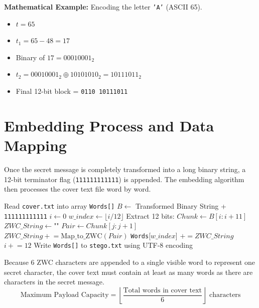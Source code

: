 \documentclass[12pt,a4paper]{report}
\begin{document}
\textbf{Mathematical Example:} Encoding the letter \texttt{'A'} (ASCII 65).
\begin{itemize}
    \item $t = 65$
    \item $t_1 = 65 - 48 = 17$
    \item Binary of $17 = 00010001_2$
    \item $t_2 = 00010001_2 \oplus 10101010_2 = 10111011_2$
    \item Final 12-bit block = \texttt{0110 10111011}
\end{itemize}

\section{Embedding Process and Data Mapping}
Once the secret message is completely transformed into a long binary string, a 12-bit terminator flag (\texttt{111111111111}) is appended. The embedding algorithm then processes the cover text file word by word. 

\begin{algorithm}[H]
\caption{Zero-Width Character Embedding}
\label{alg:zwc_embed}
\begin{algorithmic}[1]
\STATE Read \texttt{cover.txt} into array \texttt{Words[]}
\STATE $B \leftarrow$ Transformed Binary String + \texttt{111111111111}
\STATE $i \leftarrow 0$
    \STATE $w\_index \leftarrow \lfloor i / 12 \rfloor$
    \STATE Extract 12 bits: $Chunk \leftarrow B[i : i+11]$
    \STATE $ZWC\_String \leftarrow \text{""}$
        \STATE $Pair \leftarrow Chunk[j:j+1]$
        \STATE $ZWC\_String \mathrel{+}= \text{Map\_to\_ZWC}(Pair)$
    \ENDFOR
    \STATE \texttt{Words}[$w\_index$] $\mathrel{+}= ZWC\_String$
    \STATE $i \mathrel{+}= 12$
\ENDWHILE
\STATE Write \texttt{Words[]} to \texttt{stego.txt} using UTF-8 encoding
\end{algorithmic}
\end{algorithm}

Because 6 ZWC characters are appended to a single visible word to represent one secret character, the cover text must contain at least as many words as there are characters in the secret message.
$$ \text{Maximum Payload Capacity} = \left\lfloor \frac{\text{Total words in cover text}}{6} \right\rfloor \text{ characters} $$
\end{document}
